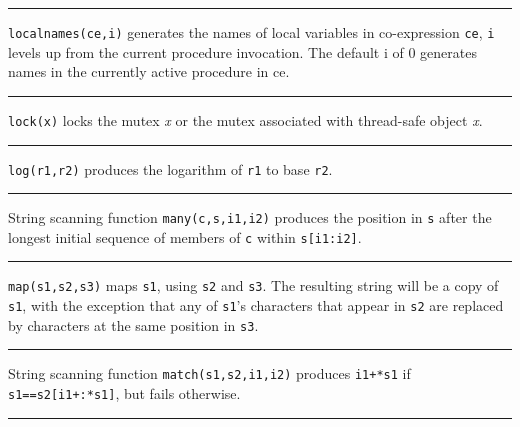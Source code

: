 \bigskip\hrule\vspace{0.1cm}

\noindent
{}\texttt{localnames(ce,i)} generates the
names of local variables in co-expression \texttt{ce}, \texttt{i}
levels up from the current procedure invocation. The default i of 0
generates names in the currently active procedure in ce.

\bigskip\hrule\vspace{0.1cm}

\noindent
{}\texttt{lock(x)} locks the mutex {\textit x} or the mutex
associated with thread-safe object {\textit x}.

\bigskip\hrule\vspace{0.1cm}

\noindent
{}\texttt{log(r1,r2)} produces the logarithm of
\texttt{r1} to base \texttt{r2}.

\bigskip\hrule\vspace{0.1cm}

\noindent
{}String scanning function \texttt{many(c,s,i1,i2)} produces
the position in \texttt{s} after the longest initial sequence of
members of \texttt{c} within \texttt{s[i1:i2]}.

\bigskip\hrule\vspace{0.1cm}

\noindent
{}\texttt{map(s1,s2,s3)} maps \texttt{s1}, using
\texttt{s2} and \texttt{s3}. The resulting string will be a copy of
\texttt{s1}, with the exception that any of
\texttt{s1}'s characters that appear in \texttt{s2}
are replaced by characters at the same position in \texttt{s3}.

\bigskip\hrule\vspace{0.1cm}

\noindent
{}String scanning function \texttt{match(s1,s2,i1,i2)}
produces \texttt{i1+*s1} if \texttt{s1==s2[i1+:*s1]}, but fails
otherwise.

\bigskip\hrule\vspace{0.1cm}

